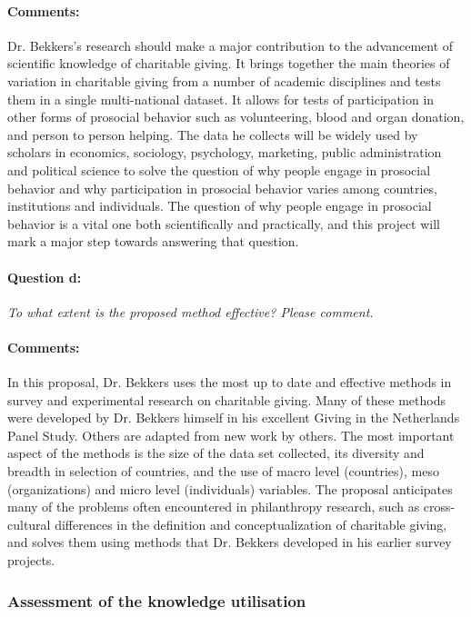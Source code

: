 \documentclass[twocolumn, serif, rga, numeric]{jote-article}
\begin{document}
\paragraph{Comments:}
Dr. Bekkers's research should make a major contribution to the advancement of scientific knowledge of charitable giving. It brings together the main theories of variation in charitable giving from a number of academic disciplines and tests them in a single multi-national dataset. It allows for tests of participation in other forms of prosocial behavior such as volunteering, blood and organ donation, and person to person helping. The data he collects will be widely used by scholars in economics, sociology, psychology, marketing, public administration and political science to solve the question of why people engage in prosocial behavior and why participation in prosocial behavior varies among countries, institutions and individuals. The question of why people engage in prosocial behavior is a vital one both scientifically and practically, and this project will mark a major step towards answering that question.
\paragraph{Question d:}
\textit{To what extent is the proposed method effective? Please comment.}
\paragraph{Comments:}
In this proposal, Dr. Bekkers uses the most up to date and effective methods in survey and experimental research on charitable giving. Many of these methods were developed by Dr. Bekkers himself in his excellent Giving in the Netherlands Panel Study. Others are adapted from new work by others. The most important aspect of the methods is the size of the data set collected, its diversity and breadth in selection of countries, and the use of macro level (countries), meso (organizations) and micro level (individuals) variables. The proposal anticipates many of the problems often encountered in philanthropy research, such as cross-cultural differences in the definition and conceptualization of charitable giving, and solves them using methods that Dr. Bekkers developed in his earlier survey projects.
 {}\subsubsection*{Assessment of the knowledge utilisation} 
\end{document}
